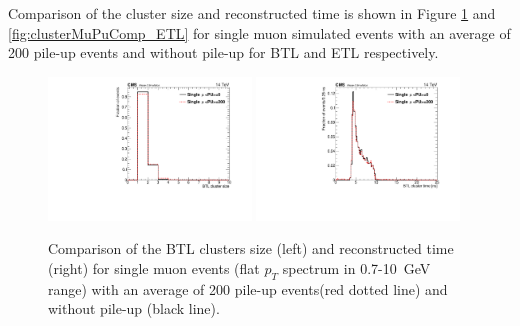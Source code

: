 Comparison of the cluster size and reconstructed time 
is shown in Figure \ref{fig:clusterMuPuComp_BTL} and \ref{fig:clusterMuPuComp_ETL} for single muon simulated events with an average of 200 pile-up events and without pile-up for BTL and ETL respectively.

\begin{figure}[!h]
\centering
\includegraphics[width=0.48\textwidth]{fig/performance/ClusterAndTracks/noPreliminary/BTLbestCluster_size_muPUcomp-4.pdf}
\includegraphics[width=0.48\textwidth]{fig/performance/ClusterAndTracks/noPreliminary/BTLbestCluster_time_muPUcomp-4.pdf}
\caption{Comparison of the BTL clusters size (left) and reconstructed time (right)
for single muon events (flat $p_{T}$ spectrum in 0.7-10~GeV range) with an average of 200 pile-up events(red dotted line) and without pile-up (black line).}
\label{fig:clusterMuPuComp_BTL}
\end{figure}

